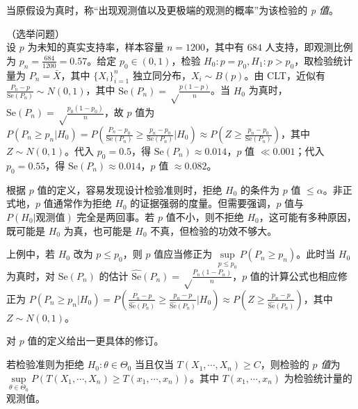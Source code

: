 \documentclass[../main.tex]{subfiles}
\begin{document}
\begin{definition}\label{def:7.4.1}
    当原假设为真时，称“出现观测值以及更极端的观测的概率”为该检验的 \emph{p 值}。
\end{definition}

\begin{example}
    （选举问题）\\
    设 $p$ 为未知的真实支持率，样本容量 $n=1200$，其中有 $684$ 人支持，即观测比例为 $p_n=\frac{684}{1200}=0.57$。给定 $p_0\in(0,1)$，检验 $H_0:p=p_0,H_1:p>p_0$，取检验统计量为 $P_n=\bar X$，其中 $\{X_i\}_{i=1}^n$ 独立同分布，$X_i\sim B(p)$。由 CLT，近似有 $\frac{P_n-p}{\mathrm{Se}(P_n)}\sim N(0,1)$，其中 $\mathrm{Se}(P_n)=\sqrt\frac{p(1-p)}n$。当 $H_0$ 为真时，$\mathrm{Se}(P_n)=\sqrt\frac{p_0(1-p_0)}n$，故 $p$ 值为 $P(P_n\geq p_n|H_0)=P(\frac{P_n-p_0}{\mathrm{Se}(P_n)}\geq\frac{p_n-p_0}{\mathrm{Se}(P_n)}|H_0)\approx P(Z\geq\frac{p_n-p_0}{\mathrm{Se}(P_n)})$，其中 $Z\sim N(0,1)$。代入 $p_0=0.5$，得 $\mathrm{Se}(P_n)\approx0.014$，$p$ 值 $\ll0.001$；代入 $p_0=0.55$，得 $\mathrm{Se}(P_n)\approx0.014$，$p$ 值 $\approx0.082$。
\end{example}

根据 $p$ 值的定义，容易发现设计检验准则时，拒绝 $H_0$ 的条件为 $p$ 值 $\leq\alpha$。非正式地，$p$ 值通常作为拒绝 $H_0$ 的证据强弱的度量。但需要强调，$p$ 值与 $P(H_0|\text{观测值})$ 完全是两回事。若 $p$ 值不小，则不拒绝 $H_0$，这可能有多种原因，既可能是 $H_0$ 为真，也可能是 $H_0$ 不真，但检验的功效不够大。

上例中，若 $H_0$ 改为 $p\leq p_0$，则 $p$ 值应当修正为 $\sup\limits_{p\leq p_0}P(P_n\geq p_n)$。此时当 $H_0$ 为真时，对 $\mathrm{Se}(P_n)$ 的估计 $\widehat{\mathrm{Se}}(P_n)=\sqrt\frac{P_n(1-P_n)}n$，$p$ 值的计算公式也相应修正为 $P(P_n\geq p_n|H_0)=P(\frac{P_n-p}{\widehat{\mathrm{Se}}(P_n)}\geq\frac{p_n-p}{\widehat{\mathrm{Se}}(P_n)}|H_0)\approx P(Z\geq\frac{p_n-p}{\widehat{\mathrm{Se}}(P_n)})$，其中 $Z\sim N(0,1)$。

对 $p$ 值的定义给出一更具体的修订。

\begin{definition}\label{def:7.4.2}
    若检验准则为拒绝 $H_0:\theta\in\Theta_0$ 当且仅当 $T(X_1,\cdots,X_n)\geq C$，则检验的 \emph{$p$ 值}为 $\sup\limits_{\theta\in\Theta_0}P(T(X_1,\cdots,X_n)\geq T(x_1,\cdots,x_n))$。其中 $T(x_1,\cdots,x_n)$ 为检验统计量的观测值。
\end{definition}
\end{document}
